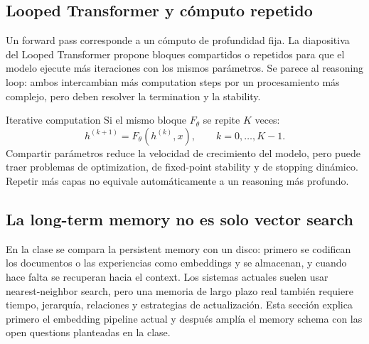
\subsection{Looped Transformer y cómputo repetido}

Un forward pass corresponde a un cómputo de profundidad fija. La diapositiva del Looped Transformer propone bloques compartidos o repetidos para que el modelo ejecute más iteraciones con los mismos parámetros. Se parece al reasoning loop: ambos intercambian más computation steps por un procesamiento más complejo, pero deben resolver la termination y la stability.


\begin{importantbox}{Iterative computation}
Si el mismo bloque $F_\theta$ se repite $K$ veces:
\[
h^{(k+1)}=F_\theta(h^{(k)},x),\qquad k=0,\ldots,K-1.
\]
Compartir parámetros reduce la velocidad de crecimiento del modelo, pero puede traer problemas de optimization, de fixed-point stability y de stopping dinámico. Repetir más capas no equivale automáticamente a un reasoning más profundo.
\end{importantbox}

\subsection{La long-term memory no es solo vector search}

En la clase se compara la persistent memory con un disco: primero se codifican los documentos o las experiencias como embeddings y se almacenan, y cuando hace falta se recuperan hacia el context. Los sistemas actuales suelen usar nearest-neighbor search, pero una memoria de largo plazo real también requiere tiempo, jerarquía, relaciones y estrategias de actualización. Esta sección explica primero el embedding pipeline actual y después amplía el memory schema con las open questions planteadas en la clase.


